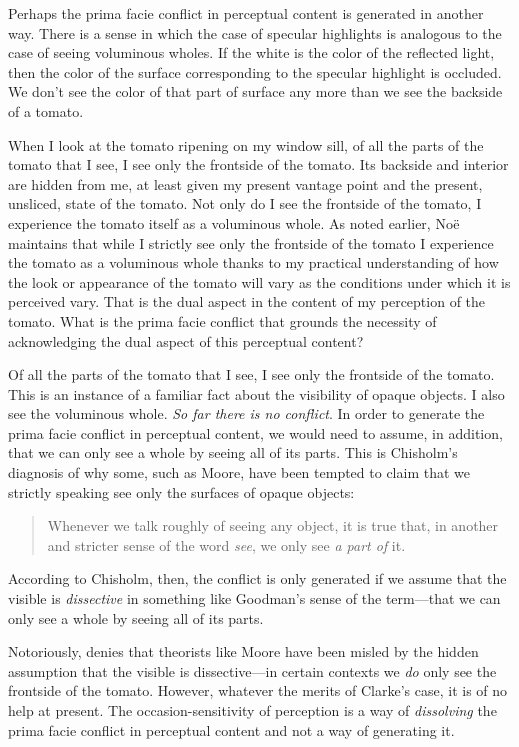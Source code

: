 \documentclass[12pt]{article}
\begin{document}
Perhaps the prima facie conflict in perceptual content is generated in another way. There is a sense in which the case of specular highlights is analogous to the case of seeing voluminous wholes. If the white is the color of the reflected light, then the color of the surface corresponding to the specular highlight is occluded. We don't see the color of that part of surface any more than we see the backside of a tomato. 

When I look at the tomato ripening on my window sill, of all the parts of the tomato that I see, I see only the frontside of the tomato. Its backside and interior are hidden from me, at least given my present vantage point and the present, unsliced, state of the tomato. Not only do I see the frontside of the tomato, I experience the tomato itself as a voluminous whole. As noted earlier, Noë maintains that while I strictly see only the frontside of the tomato I experience the tomato as a voluminous whole thanks to my practical understanding of how the look or appearance of the tomato will vary as the conditions under which it is perceived vary. That is the dual aspect in the content of my perception of the tomato. What is the prima facie conflict that grounds the necessity of acknowledging the dual aspect of this perceptual content?

Of all the parts of the tomato that I see, I see only the frontside of the tomato. This is an instance of a familiar fact about the visibility of opaque objects. I also see the voluminous whole. \emph{So far there is no conflict}. In order to generate the prima facie conflict in perceptual content, we would need to assume, in addition, that we can only see a whole by seeing all of its parts. This is Chisholm's \citeyearpar[154--156]{Chisholm:1957dq} diagnosis of why some, such as Moore, have been tempted to claim that we strictly speaking see only the surfaces of opaque objects:
\begin{quote}
	Whenever we talk roughly of seeing any object, it is true that, in another and stricter sense of the word \emph{see}, we only see \emph{a part of} it. \citep[34]{Moore:1953nx}
\end{quote}
According to Chisholm, then, the conflict is only generated if we assume that the visible is \emph{dissective} in something like Goodman's \citeyearpar[48-49]{Goodman:1951ww} sense of the term---that we can only see a whole by seeing all of its parts. 

Notoriously, \citet{Clarke:1965yg} denies that theorists like Moore have been misled by the hidden assumption that the visible is dissective---in certain contexts we \emph{do} only see the frontside of the tomato. However, whatever the merits of Clarke's case, it is of no help at present. The occasion-sensitivity of perception is a way of \emph{dissolving} the prima facie conflict in perceptual content and not a way of generating it.
\end{document}
